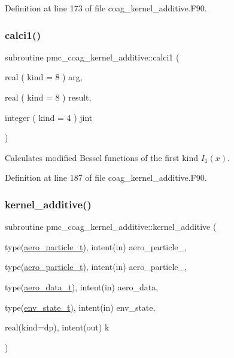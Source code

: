 Definition at line 173 of file coag\+\_\+kernel\+\_\+additive.\+F90.

\mbox{\label{namespacepmc__coag__kernel__additive_a033edc5451a3797e4d922139dd6dad0f}} 
\subsubsection{\texorpdfstring{calci1()}{calci1()}}
{\footnotesize\ttfamily subroutine pmc\+\_\+coag\+\_\+kernel\+\_\+additive\+::calci1 (\begin{DoxyParamCaption}\item[{real ( kind = 8 )}]{arg,  }\item[{real ( kind = 8 )}]{result,  }\item[{integer ( kind = 4 )}]{jint }\end{DoxyParamCaption})}



Calculates modified Bessel functions of the first kind $ I_1(x) $. 



Definition at line 187 of file coag\+\_\+kernel\+\_\+additive.\+F90.

\mbox{\label{namespacepmc__coag__kernel__additive_a104dc134e55b7e9c4271f754feb593c0}} 
\subsubsection{\texorpdfstring{kernel\+\_\+additive()}{kernel\_additive()}}
{\footnotesize\ttfamily subroutine pmc\+\_\+coag\+\_\+kernel\+\_\+additive\+::kernel\+\_\+additive (\begin{DoxyParamCaption}\item[{type(\mbox{\hyperlink{structpmc__aero__particle_1_1aero__particle__t}{aero\+\_\+particle\+\_\+t}}), intent(in)}]{aero\+\_\+particle\+\_,  }\item[{type(\mbox{\hyperlink{structpmc__aero__particle_1_1aero__particle__t}{aero\+\_\+particle\+\_\+t}}), intent(in)}]{aero\+\_\+particle\+\_,  }\item[{type(\mbox{\hyperlink{structpmc__aero__data_1_1aero__data__t}{aero\+\_\+data\+\_\+t}}), intent(in)}]{aero\+\_\+data,  }\item[{type(\mbox{\hyperlink{structpmc__env__state_1_1env__state__t}{env\+\_\+state\+\_\+t}}), intent(in)}]{env\+\_\+state,  }\item[{real(kind=dp), intent(out)}]{k }\end{DoxyParamCaption})}



